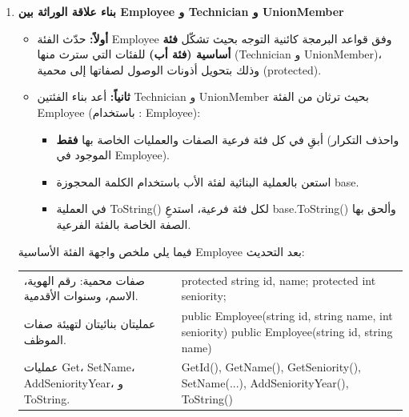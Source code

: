 \documentclass[14pt]{extarticle}
\begin{document}
\begin{enumerate}[label=\textbf{تمرين \arabic*:}, wide=0pt, itemsep=2.2em]

    \item \textbf{بناء علاقة الوراثة بين \textenglish{Employee} و \textenglish{Technician} و \textenglish{UnionMember}}
    \begin{itemize}
        \item \textbf{أولاً:} حدّث الفئة \textenglish{Employee} وفق قواعد البرمجة كائنية التوجه بحيث تشكّل \textbf{فئة أساسية (فئة أب)} للفئات التي سترث منها (\textenglish{Technician} و \textenglish{UnionMember})، وذلك بتحويل أذونات الوصول لصفاتها إلى محمية (\textenglish{protected}).
        \item \textbf{ثانياً:} أعد بناء الفئتين \textenglish{Technician} و \textenglish{UnionMember} بحيث ترثان من الفئة \textenglish{Employee} (باستخدام \textenglish{: Employee}):
        \begin{itemize}
            \item أبقِ في كل فئة فرعية الصفات والعمليات الخاصة بها \textbf{فقط} (واحذف التكرار الموجود في \textenglish{Employee}).
            \item استعن بالعملية البنائية لفئة الأب باستخدام الكلمة المحجوزة \textenglish{base}.
            \item في العملية \textenglish{ToString()} لكل فئة فرعية، استدعِ \textenglish{base.ToString()} وألحق بها الصفة الخاصة بالفئة الفرعية.
        \end{itemize}
    \end{itemize}

    فيما يلي ملخص واجهة الفئة الأساسية \textenglish{Employee} بعد التحديث:

    {\renewcommand{\arraystretch}{1.2}
    \small
    \begin{longtable}{|>{\raggedleft\arraybackslash}p{}|>{\raggedright\arraybackslash}p{}|}
    \hline
    \multicolumn{2}{|c|}{\textbf{الفئة الأساسية: \textenglish{Employee}}} \\
    \hline
    صفات محمية: رقم الهوية، الاسم، وسنوات الأقدمية. & \textenglish{protected string id, name;} \newline \textenglish{protected int seniority;} \\
    \hline
    عمليتان بنائيتان لتهيئة صفات الموظف. & \textenglish{public Employee(string id, string name, int seniority)} \newline \textenglish{public Employee(string id, string name)} \\
    \hline
    عمليات \textenglish{Get}، \textenglish{SetName}، \textenglish{AddSeniorityYear}، و \textenglish{ToString}. & \textenglish{GetId(), GetName(), GetSeniority(), SetName(...), AddSeniorityYear(), ToString()} \\
    \hline
    \end{longtable}}


\end{enumerate}
\end{document}
